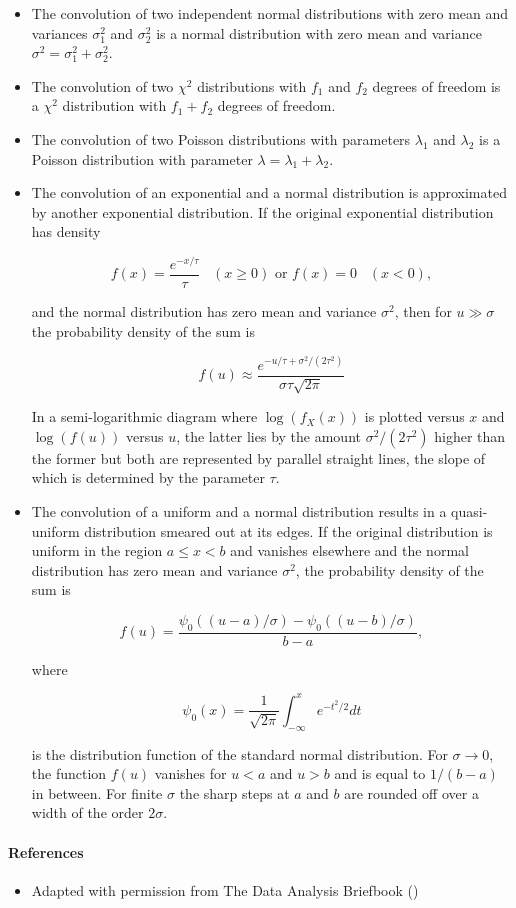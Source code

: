 \documentclass[12pt]{article}
\begin{document}
\begin{itemize}

\item The convolution of two independent normal distributions with zero mean and variances $\sigma_1^2$ and $\sigma_2^2$ is a normal distribution with zero mean and variance $\sigma^2 = \sigma_1^2 + \sigma_2^2$.

\item The convolution of two $\chi^2$ distributions with $f_1$ and $f_2$ degrees of freedom is a $\chi^2$ distribution with $f_1 + f_2$ degrees of freedom.

\item The convolution of two Poisson distributions with parameters $\lambda_1$  and $\lambda_2$  is a Poisson distribution with parameter $\lambda = \lambda_1 + \lambda_2$.

\item The convolution of an exponential and a normal distribution is approximated by another exponential distribution. If the original exponential distribution has density

\[ f(x)=\frac{e^{-x/\tau}}{\tau} \;\;\; (x \ge 0) \text{ or } f(x)=0 \;\;\; (x < 0) , \]

and the normal distribution has zero mean and variance $\sigma^2$, then for $u \gg \sigma$ the probability density of the sum is 

\[
f(u) \approx \frac{e^{-u/\tau + \sigma^2/(2\tau^2)}}{\sigma \tau \sqrt{2\pi}}
\]

In a semi-logarithmic diagram where $\log(f_X(x))$ is plotted versus $x$ and $\log (f(u))$ versus $u$, the latter lies by the amount $\sigma^2/(2\tau^2)$ higher than the former but both are represented by parallel straight lines, the slope of which is determined by the parameter $\tau$.

\item  The convolution of a uniform and a normal distribution results in a quasi-uniform distribution smeared out at its edges. If the original distribution is uniform in the region $a \le x < b$  and vanishes elsewhere and the normal distribution has zero mean and variance $\sigma^2$, the probability density of the sum is

\[
f(u) = \frac{\psi_0((u-a)/\sigma)-\psi_0((u-b)/\sigma)}{b-a},
\]

where

\[
\psi_0(x) = \frac{1}{\sqrt{2\pi}} \int_{-\infty}^x e^{-t^2/2} dt
\]

is the distribution function of the standard normal distribution. For $\sigma \rightarrow 0$, the function $f(u)$ vanishes for $u<a$ and $u>b$ and is equal to $1/(b-a)$ in between. For finite $\sigma$  the sharp steps at $a$ and $b$ are rounded off over a width of the order $2\sigma$.

\end{itemize}

\paragraph{References}

\begin{itemize}
\item Adapted with permission from The Data Analysis Briefbook
()
\end{itemize}
\end{document}
